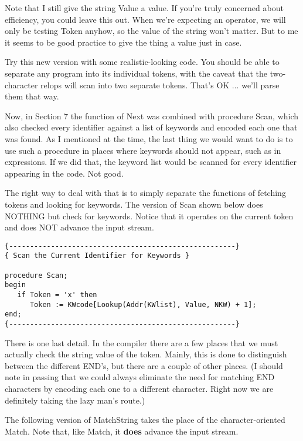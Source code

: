 Note that I still give the string Value a value. If you're truly concerned about efficiency, you could leave this out. When we're expecting an operator, we will only be testing  Token  anyhow, so the  value of the string won't matter. But to me it seems to  be good practice to give the thing a value just in case.

Try  this  new  version with some realistic-looking  code. You should  be  able  to  separate  any program into  its  individual tokens, with the  caveat  that the two-character relops will scan into two separate tokens. That's OK ... we'll  parse  them  that way.

Now, in Section 7 the function of Next was combined with procedure Scan, which  also  checked every identifier against  a  list  of keywords and encoded each one that was found. As I  mentioned at the time, the last thing we would want  to  do  is  to use such a procedure in places where keywords  should not appear, such as in expressions. If we  did  that, the keyword list would be scanned for every identifier appearing in the code. Not good.

The  right  way  to  deal  with  that  is  to simply separate the functions  of  fetching  tokens and looking for  keywords. The version of Scan shown below  does NOTHING but check for keywords. Notice that it operates on the current token and does NOT advance the input stream.

\begin{verbatim}
{------------------------------------------------------}
{ Scan the Current Identifier for Keywords }

procedure Scan;
begin
   if Token = 'x' then
      Token := KWcode[Lookup(Addr(KWlist), Value, NKW) + 1];
end;
{------------------------------------------------------}
\end{verbatim}

There is one last detail. In the compiler there are a few places that we must  actually  check  the  string  value  of  the token. Mainly, this  is done to distinguish between the different END's, but there are a couple  of  other  places. (I  should  note in passing that we could always  eliminate the need for matching END characters by encoding each one  to a different character. Right now we are definitely taking the lazy man's route.)

The  following  version  of MatchString takes the  place  of  the character-oriented Match. Note that, like Match, it {\bfseries does} advance the input stream.

